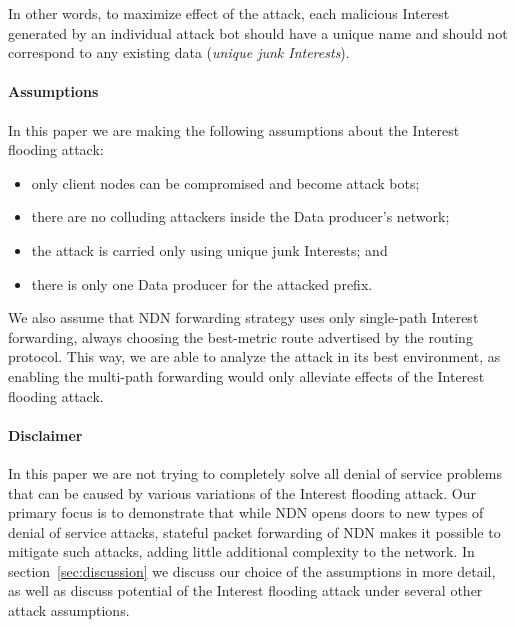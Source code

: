 In other words, to maximize effect of the attack, each malicious Interest generated by an individual attack bot should have a unique name and should not correspond to any existing data (\emph{unique junk Interests}).

\paragraph{Assumptions}

In this paper we are making the following assumptions about the Interest flooding attack:
\begin{itemize}
\item only client nodes can be compromised and become attack bots;
\item there are no colluding attackers inside the Data producer's network;
\item the attack is carried only using unique junk Interests; and
\item there is only one Data producer for the attacked prefix.
\end{itemize}

We also assume that NDN forwarding strategy uses only single-path Interest forwarding, always choosing the best-metric route advertised by the routing protocol.
This way, we are able to analyze the attack in its best environment, as enabling the multi-path forwarding would only alleviate effects of the Interest flooding attack.

\paragraph{Disclaimer}

In this paper we are not trying to completely solve all denial of service problems that can be caused by various variations of the Interest flooding attack.
Our primary focus is to demonstrate that while NDN opens doors to new types of denial of service attacks, stateful packet forwarding of NDN makes it possible to mitigate such attacks, adding little additional complexity to the network.
In section~\ref{sec:discussion} we discuss our choice of the assumptions in more detail, as well as discuss potential of the Interest flooding attack under several other attack assumptions.


